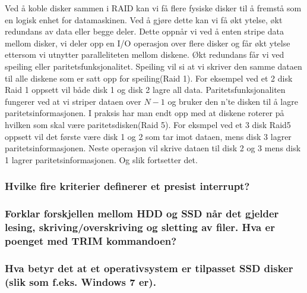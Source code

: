 \documentclass[11pt]{article}
\begin{document}
Ved å koble disker sammen i RAID kan vi få flere fysiske disker til å fremstå som en logisk enhet for datamaskinen. Ved å gjøre dette kan vi få økt ytelse, økt redundans av data eller begge deler. Dette oppnår vi ved å enten stripe data mellom disker, vi deler opp en I/O operasjon over flere disker og får økt ytelse ettersom vi utnytter paralleliteten mellom diskene. Økt redundans får vi ved speiling eller paritetsfunksjonalitet. Speiling vil si at vi skriver den samme dataen til alle diskene som er satt opp for speiling(Raid 1). For eksempel ved et 2 disk Raid 1 oppsett vil både disk 1 og disk 2 lagre all data. Paritetsfunksjonaliten fungerer ved at vi striper dataen over $N - 1$ og bruker den n'te disken til å lagre paritetsinformasjonen. I praksis har man endt opp med at diskene roterer på hvilken som skal være paritetsdisken(Raid 5). For eksmpel ved et 3 disk Raid5 oppsett vil det første være disk 1 og 2 som tar imot dataen, mens disk 3 lagrer paritetsinformasjonen. Neste operasjon vil skrive dataen til disk 2 og 3 mens disk 1 lagrer paritetsinformasjonen. Og slik fortsetter det.  

\subsubsection{Hvilke fire kriterier definerer et presist interrupt?}



\subsubsection{Forklar forskjellen mellom HDD og SSD når det gjelder lesing, skriving/overskriving og sletting av filer. Hva er poenget med TRIM kommandoen?}
\subsubsection{Hva betyr det at et operativsystem er tilpasset SSD disker (slik som f.eks. Windows 7 er).}
\end{document}
